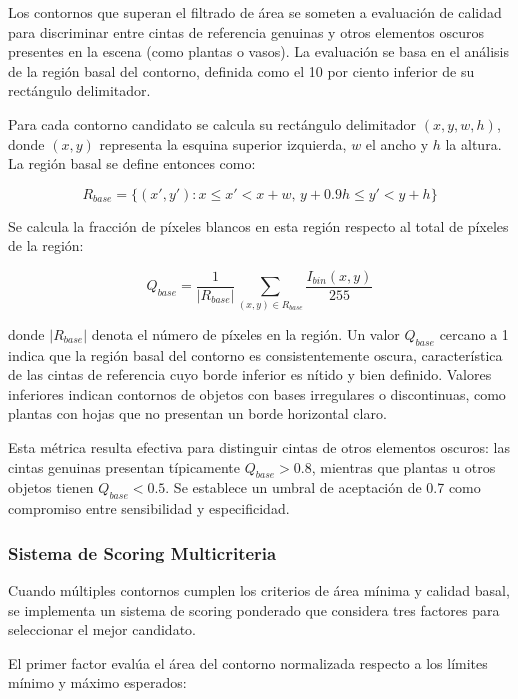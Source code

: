 Los contornos que superan el filtrado de área se someten a evaluación de calidad para discriminar entre cintas de referencia genuinas y otros elementos oscuros presentes en la escena (como plantas o vasos). La evaluación se basa en el análisis de la región basal del contorno, definida como el 10 por ciento inferior de su rectángulo delimitador.

Para cada contorno candidato se calcula su rectángulo delimitador $(x, y, w, h)$, donde $(x,y)$ representa la esquina superior izquierda, $w$ el ancho y $h$ la altura. La región basal se define entonces como:

\begin{equation}
R_{base} = \{(x',y') : x \leq x' < x+w, \, y+0.9h \leq y' < y+h\}
\end{equation}

Se calcula la fracción de píxeles blancos en esta región respecto al total de píxeles de la región:

\begin{equation}
Q_{base} = \frac{1}{|R_{base}|} \sum_{(x,y) \in R_{base}} \frac{I_{bin}(x,y)}{255}
\end{equation}

donde $|R_{base}|$ denota el número de píxeles en la región. Un valor $Q_{base}$ cercano a 1 indica que la región basal del contorno es consistentemente oscura, característica de las cintas de referencia cuyo borde inferior es nítido y bien definido. Valores inferiores indican contornos de objetos con bases irregulares o discontinuas, como plantas con hojas que no presentan un borde horizontal claro.

Esta métrica resulta efectiva para distinguir cintas de otros elementos oscuros: las cintas genuinas presentan típicamente $Q_{base} > 0.8$, mientras que plantas u otros objetos tienen $Q_{base} < 0.5$. Se establece un umbral de aceptación de 0.7 como compromiso entre sensibilidad y especificidad.

\subsubsection{Sistema de Scoring Multicriteria}

Cuando múltiples contornos cumplen los criterios de área mínima y calidad basal, se implementa un sistema de scoring ponderado que considera tres factores para seleccionar el mejor candidato.

El primer factor evalúa el área del contorno normalizada respecto a los límites mínimo y máximo esperados:

